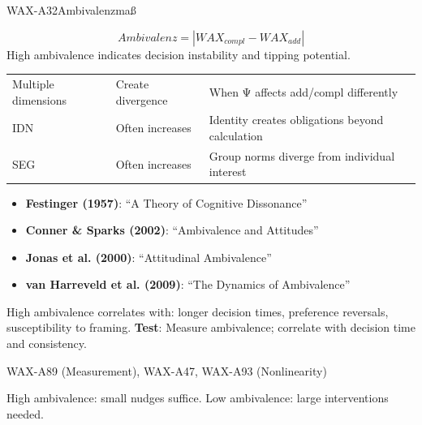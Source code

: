\begin{axiomspec}{WAX-A32}{Ambivalenzmaß}

\begin{equation}
Ambivalenz = |WAX_{compl} - WAX_{add}|
\end{equation}
High ambivalence indicates decision instability and tipping potential.

\begin{tabular}{lll}
Multiple dimensions & Create divergence & When Ψ affects add/compl differently \\
IDN & Often increases & Identity creates obligations beyond calculation \\
SEG & Often increases & Group norms diverge from individual interest \\
\end{tabular}

\begin{itemize}
\item \textbf{Festinger (1957)}: ``A Theory of Cognitive Dissonance''
\item \textbf{Conner \& Sparks (2002)}: ``Ambivalence and Attitudes''
\item \textbf{Jonas et al. (2000)}: ``Attitudinal Ambivalence''
\item \textbf{van Harreveld et al. (2009)}: ``The Dynamics of Ambivalence''
\end{itemize}

High ambivalence correlates with: longer decision times, preference reversals, susceptibility to framing.
\textbf{Test}: Measure ambivalence; correlate with decision time and consistency.

WAX-A89 (Measurement), WAX-A47, WAX-A93 (Nonlinearity)

High ambivalence: small nudges suffice. Low ambivalence: large interventions needed.

\end{axiomspec}


